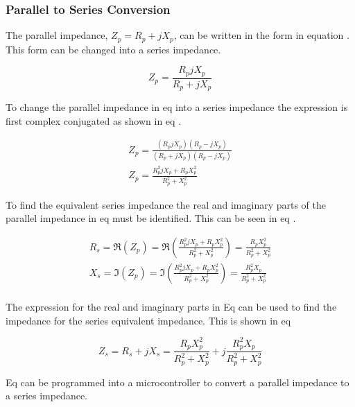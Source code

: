 \subsubsection{Parallel to Series Conversion} \label{subsec:SeriesToParallel_conv2}

The parallel impedance, $Z_p = R_p + jX_p$, can be written in the form in equation . This form can be changed into a series impedance.

\begin{equation}\label{eq:4_1_5_ParallelModelps1}
        Z_p = \frac{R_p j X_p}{R_p + jX_p}
\end{equation}

To change the parallel impedance in eq  into a series impedance the expression is first complex conjugated as shown in eq .

\begin{equation}\label{eq:4_1_5_ParallelModelps2}
    \begin{split}
    Z_p = \frac{(R_p j X_p)(R_p - jX_p)}{(R_p + jX_p)(R_p - jX_p)}  \\
    Z_p = \frac{R_p^2 jX_p + R_pX_p^2}{R_p^2+X_p^2}
    \end{split}
\end{equation}

To find the equivalent series impedance the real and imaginary parts of the parallel impedance in eq  must be identified. This can be seen in eq .

\begin{equation}\label{eq:4_1_5_ParallelModelps3}
    \begin{split}
    R_s = \Re(Z_p) = \Re\left(\frac{R_p^2 jX_p + R_pX_p^2}{R_p^2+X_p^2}\right) = \frac{R_pX_p^2}{R_p^2+X_p^2}  \\
    X_s = \Im(Z_p)=\Im\left(\frac{R_p^2 jX_p + R_pX_p^2}{R_p^2+X_p^2}\right) = \frac{R_p^2X_p}{R_p^2+X_p^2}  \\
    \end{split}
\end{equation}

The expression for the real and imaginary parts in Eq  can be used to find the impedance for the series equivalent impedance. This is shown in eq 

\begin{equation}\label{eq:4_1_5_ParallelModelps4}
    Z_s = R_s + jX_s = \frac{R_pX_p^2}{R_p^2+X_p^2} + j\frac{R_p^2X_p}{R_p^2+X_p^2} 
\end{equation}

Eq  can be programmed into a microcontroller to convert a parallel impedance to a series impedance.